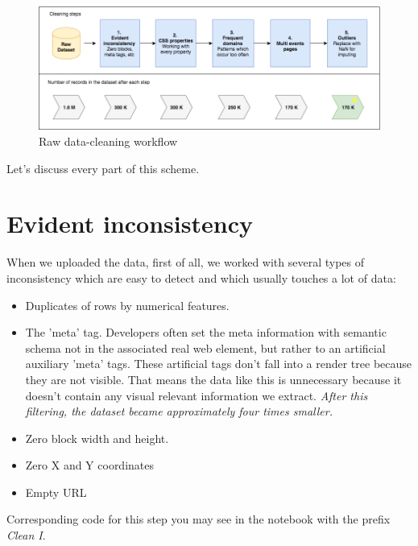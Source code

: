 \begin{figure}[h]
\begin{center}
\includegraphics[width=1.0\textwidth]{figures06/clean_workflow4}
\caption{Raw data-cleaning workflow}
\label{fig:clean}
\end{center}
\end{figure}

Let's discuss every part of this scheme.\\

\section{Evident inconsistency}

When we uploaded the data, first of all, we worked with several types of inconsistency which are easy to detect and which usually touches a lot of data:

\begin{itemize}
    \item Duplicates of rows by numerical features.
    \item The 'meta' tag. Developers often set the meta information with semantic schema not in the associated real web element, but rather to an artificial auxiliary 'meta' tags. These artificial tags don't fall into a render tree because they are not visible. That means the data like this is unnecessary because it doesn't contain any visual relevant information we extract. \textit{After this filtering, the dataset became approximately four times smaller.}
    \item Zero block width and height.
    \item Zero X and Y coordinates
    \item Empty URL
\end{itemize}

Corresponding code for this step you may see in the notebook with the prefix \textit{Clean I}.


